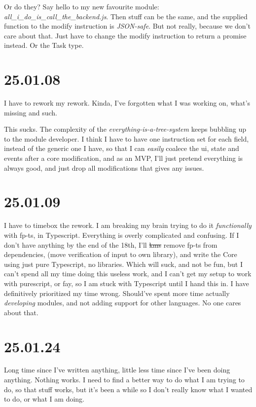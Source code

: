 Or do they? Say hello to my new favourite module:
\textit{all_i_do_is_call_the_backend.js}. Then stuff can be the same, and the
supplied function to the modify instruction is \textit{JSON-safe}. But not
really, because we don't care about that. Just have to change the modify
instruction to return a promise instead. Or the Task type.

\section{25.01.08}

I have to rework my rework. Kinda, I've forgotten what I was working on, what's
missing and such.

This sucks. The complexity of the \textit{everything-is-a-tree-system} keeps
bubbling up to the module developer. I think I have to have one instruction set
for each field, instead of the generic one I have, so that I can \textit{easily}
coalece the ui, state and events after a core modification, and as an MVP, I'll
just pretend everything is always good, and just drop all modifications that
gives any issues.

\section{25.01.09}

I have to timebox the rework. I am breaking my brain trying to do it
\textit{functionally} with fp-ts, in Typescript. Everything is overly
complicated and confusing. If I don't have anything by the end of the 18th, I'll
\sout{kms} remove fp-ts from dependencies, (move verification of input to own
library), and write the Core using just pure Typescript, no libraries. Which
will suck, and not be fun, but I can't spend all my time doing this useless
work, and I can't get my setup to work with purescript, or fay, so I am stuck
with Typescript until I hand this in. I have definitively prioritized my time
wrong. Should've spent more time actually \textit{developing} modules, and not
adding support for other languages. No one cares about that.

\section{25.01.24}

Long time since I've written anything, little less time since I've been doing
anything. Nothing works. I need to find a better way to do what I am trying to
do, so that stuff works, but it's been a while so I don't really know what I
wanted to do, or what I am doing.

